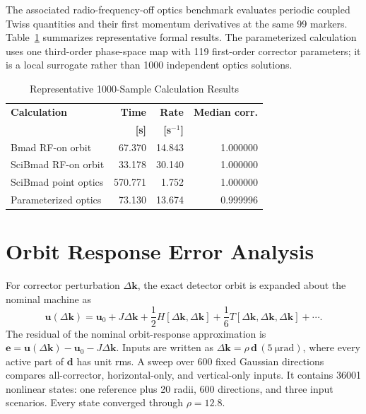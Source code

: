 \documentclass[letterpaper]{jacow}
\begin{document}
The associated radio-frequency-off optics benchmark evaluates periodic
coupled Twiss quantities and their first momentum derivatives at the same 99
markers.  Table~\ref{tab:calculation} summarizes representative formal results.
The parameterized calculation uses one third-order phase-space map with 119
first-order corrector parameters; it is a local surrogate rather than 1000
independent optics solutions.

\begin{table}[!htb]
  \centering
  \caption{Representative 1000-Sample Calculation Results}
  \footnotesize
  \begin{tabular}{@{}lrrr@{}}
    \toprule
    \textbf{Calculation} & \textbf{Time} & \textbf{Rate} & \textbf{Median corr.} \\
                         & \textbf{[s]}  & \textbf{[s$^{-1}$]} & \\
    \midrule
    Bmad RF-on orbit       & 67.370  & 14.843 & 1.000000 \\
    SciBmad RF-on orbit    & 33.178  & 30.140 & 1.000000 \\
    SciBmad point optics   & 570.771 & 1.752  & 1.000000 \\
    Parameterized optics   & 73.130  & 13.674 & 0.999996 \\
    \bottomrule
  \end{tabular}
  \label{tab:calculation}
\end{table}

\section{Orbit Response Error Analysis}

For corrector perturbation $\Delta\bm k$, the exact detector orbit is expanded
about the nominal machine as
\begin{equation}
  \bm u(\Delta\bm k)=\bm u_0+J\Delta\bm k
  +\frac{1}{2}H[\Delta\bm k,\Delta\bm k]
  +\frac{1}{6}T[\Delta\bm k,\Delta\bm k,\Delta\bm k]+\cdots .
  \label{eq:taylor}
\end{equation}
The residual of the nominal orbit-response approximation is
$\bm e=\bm u(\Delta\bm k)-\bm u_0-J\Delta\bm k$.  Inputs are written as
$\Delta\bm k=\rho\,\bm d\,(\qty{5}{\micro\radian})$, where every active part
of $\bm d$ has unit rms.  A sweep over 600 fixed Gaussian directions compares
all-corrector, horizontal-only, and vertical-only inputs.  It contains 36001
nonlinear states: one reference plus 20 radii, 600 directions, and three input
scenarios.  Every state converged through $\rho=12.8$.
\end{document}
